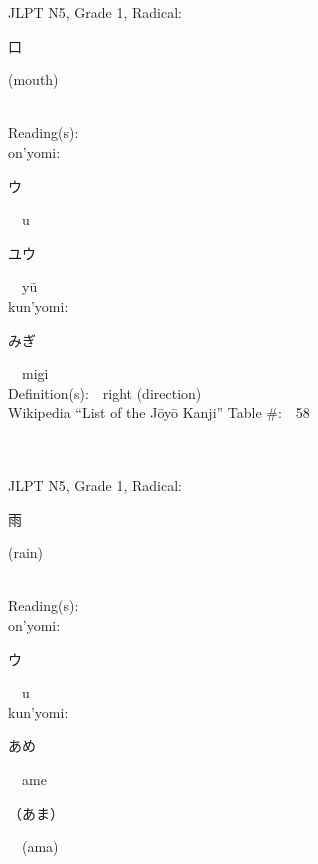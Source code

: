 \begin{multicols}{2}
{JLPT N5, Grade 1, Radical:\ \ {\begin{CJK}{UTF8}{min} 口 \end{CJK}} (mouth) } \\
Reading(s):\ \ \\
{\hspace*{1em}}on'yomi:\ \ \\
{\hspace*{2em}}{\begin{CJK}{UTF8}{min} ウ \end{CJK}}\ \ u\ \ \\
{\hspace*{2em}}{\begin{CJK}{UTF8}{min} ユウ \end{CJK}}\ \ y\=u\ \ \\
{\hspace*{1em}}kun'yomi:\ \ \\
{\hspace*{2em}}{\begin{CJK}{UTF8}{min} みぎ \end{CJK}}\ \ migi\ \ \\
Definition(s):\ \ right (direction) \\
Wikipedia ``List of the J\=oy\=o Kanji'' Table \#:\ \ 58 \\
\ \ \\
{\fontsize{34pt}{40pt}  }\ \ \\  %
{JLPT N5, Grade 1, Radical:\ \ {\begin{CJK}{UTF8}{min} 雨 \end{CJK}} (rain) } \\
Reading(s):\ \ \\
{\hspace*{1em}}on'yomi:\ \ \\
{\hspace*{2em}}{\begin{CJK}{UTF8}{min} ウ \end{CJK}}\ \ u\ \ \\
{\hspace*{1em}}kun'yomi:\ \ \\
{\hspace*{2em}}{\begin{CJK}{UTF8}{min} あめ \end{CJK}}\ \ ame\ \ \\
{\hspace*{2em}}{\begin{CJK}{UTF8}{min} （あま） \end{CJK}}\ \ (ama)\ \ \\

\end{multicols}
